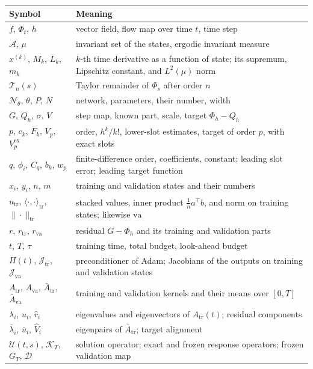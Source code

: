 \documentclass[11pt]{article}
\theoremstyle{definition}
\theoremstyle{remark}
\newcommand{\Aset}{\mathcal{A}}
\newcommand{\Net}{\mathcal{N}_\theta}
\newcommand{\ex}{\mathrm{ex}}
\newcommand{\tr}{\mathrm{tr}}
\newcommand{\va}{\mathrm{va}}
\newcommand{\Dmap}{\mathcal{D}}
\newcommand{\Kmap}{\mathcal{K}}
\newcommand{\Prop}{\mathcal{U}}
\newcommand{\Jac}{\mathcal{J}}
\newcommand{\Rem}{\mathcal{T}}
\begin{document}
\begin{table}[htbp]
\centering
\small
\begin{tabular}{@{}p{}p{}@{}}
\toprule
Symbol & Meaning \\
\midrule
$f$, $\Phi_t$, $h$ & vector field, flow map over time $t$, time step \\
$\Aset$, $\mu$ & invariant set of the states, ergodic invariant measure \\
$x^{(k)}$, $M_k$, $L_k$, $m_k$ & $k$-th time derivative as a function of state; its supremum, Lipschitz constant, and $L^2(\mu)$ norm \\
$\Rem_n(s)$ & Taylor remainder of $\Phi_s$ after order $n$ \\
$\Net$, $\theta$, $P$, $N$ & network, parameters, their number, width \\
$G$, $Q_h$, $\sigma$, $V$ & step map, known part, scale, target $\Phi_h - Q_h$ \\
$p$, $c_k$, $F_k$, $V_p$, $V_p^\ex$ & order, $h^k/k!$, lower-slot estimates, target of order $p$, with exact slots \\
$q$, $\phi_i$, $C_q$, $b_k$, $w_p$ & finite-difference order, coefficients, constant; leading slot error; leading target function \\
$x_i$, $y_i$, $n$, $m$ & training and validation states and their numbers \\
$u_\tr$, $\langle\cdot,\cdot\rangle_\tr$, $\|\cdot\|_\tr$ & stacked values, inner product $\tfrac1n a^\top b$, and norm on training states; likewise $\va$ \\
$r$, $r_\tr$, $r_\va$ & residual $G - \Phi_h$ and its training and validation parts \\
$t$, $T$, $\tau$ & training time, total budget, look-ahead budget \\
$\Pi(t)$, $\Jac_\tr$, $\Jac_\va$ & preconditioner of Adam; Jacobians of the outputs on training and validation states \\
$A_\tr$, $A_\va$, $\bar A_\tr$, $\bar A_\va$ & training and validation kernels and their means over $[0,T]$ \\
$\lambda_i$, $u_i$, $\hat r_i$ & eigenvalues and eigenvectors of $A_\tr(t)$; residual components \\
$\bar\lambda_i$, $\bar u_i$, $\hat V_i$ & eigenpairs of $\bar A_\tr$; target alignment \\
$\Prop(t,s)$, $\Kmap_T$, $G_T$, $\Dmap$ & solution operator; exact and frozen response operators; frozen validation map \\

\end{tabular}
\end{table}
\end{document}

